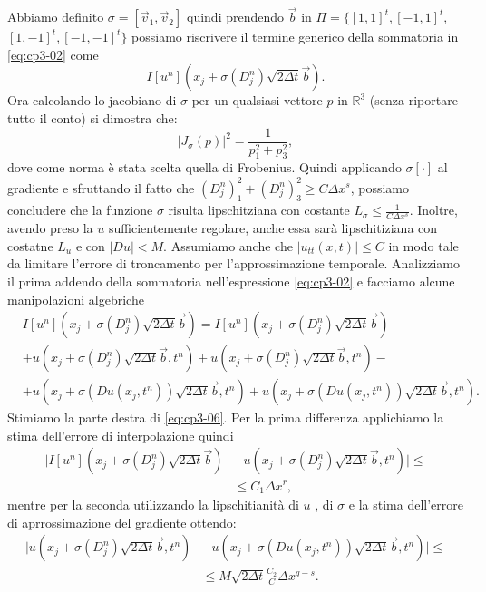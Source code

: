 Abbiamo definito $\sigma=[\vec{v}_1,\vec{v}_2]$ quindi prendendo $\vec{b}$ in $\Pi=\{[1,1]^t,[-1,1]^t,$ $[1,-1]^t,[-1,-1]^t\}$ possiamo riscrivere il termine generico della sommatoria in \eqref{eq:cp3-02} come
\[
I[u^n](x_j+\sigma(D_j^n)\sqrt{2\Delta t}\vec{b}).
\]
Ora calcolando lo jacobiano di $\sigma$ per un qualsiasi vettore $p$ in $\mathbb{R}^3$ (senza riportare tutto il conto) si dimostra che:
\[
\left|J_{\sigma}(p)\right|^2=\frac{1}{p_1^2+p_3^2},
\]
dove come norma è stata scelta quella di Frobenius. Quindi applicando $\sigma[\cdot]$ al gradiente e sfruttando il fatto che $(D_j^n)_1^2+(D_j^n)_3^2\ge C\Delta x^s$, possiamo concludere che la funzione $\sigma$ risulta lipschitziana con costante $L_{\sigma}\le\frac{1}{C\Delta x^s}$.
Inoltre, avendo preso la $u$ sufficientemente regolare, anche essa sarà lipschitiziana con costatne $L_u$ e con $|Du|< M$. Assumiamo anche che $|u_{tt}(x,t)|\le C$ in modo tale da limitare l'errore di troncamento per l'approssimazione temporale.
 Analizziamo il prima addendo della sommatoria nell'espressione \eqref{eq:cp3-02} e facciamo alcune manipolazioni algebriche
\begin{equation}
\label{eq:cp3-06}
\begin{split}
& I[u^n](x_j+\sigma(D_j^n)\sqrt{2\Delta t}\vec{b}) = I[u^n](x_j+\sigma(D_j^n)\sqrt{2\Delta t}\vec{b}) - \\
& +u(x_j+\sigma(D_j^n)\sqrt{2\Delta t}\vec{b},t^n) + u(x_j+\sigma(D_j^n)\sqrt{2\Delta t}\vec{b},t^n)- \\
& + u(x_j+\sigma(Du(x_j,t^n))\sqrt{2\Delta t}\vec{b},t^n)+ u(x_j+\sigma(Du(x_j,t^n))\sqrt{2\Delta t}\vec{b},t^n).
\end{split}
\end{equation}
Stimiamo la parte destra di \eqref{eq:cp3-06}. Per la prima differenza applichiamo la stima dell'errore di interpolazione quindi
\begin{equation}
  \label{eq:cp3-07}
  \begin{split}
    |I[u^n](x_j+\sigma(D_j^n)\sqrt{2\Delta t}\vec{b}) &- u(x_j+\sigma(D_j^n)\sqrt{2\Delta t}\vec{b},t^n)|\le \\
    & \le C_1\Delta x^r,
\end{split}
\end{equation}
mentre per la seconda utilizzando la lipschitianità di $u$ , di $\sigma$ e la stima dell'errore di aprrossimazione del gradiente ottendo:
\begin{equation}
  \label{eq:cp3-08}
  \begin{split}
    |u(x_j+\sigma(D_j^n)\sqrt{2\Delta t}\vec{b},t^n) &- u(x_j+\sigma(Du(x_j,t^n))\sqrt{2\Delta t}\vec{b},t^n)|\le \\
    & \le M\sqrt{2\Delta t}\frac{C_2}{C}\Delta x^{q-s}.
  \end{split}
\end{equation}
